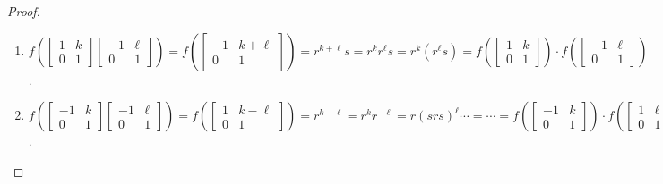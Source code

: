 \documentclass{article}
\theoremstyle{definition}
\begin{document}
\begin{proof}
\begin{enumerate}
			\item $f\left( \left[ \begin{smallmatrix} 1 & k \\ 0 & 1 \end{smallmatrix}  \right] \left[ \begin{smallmatrix} -1 & \ell \\ 0 & 1 \end{smallmatrix}  \right] \right) = f\left(\left[ \begin{smallmatrix} -1 & k+\ell \\ 0 & 1 \end{smallmatrix}  \right]\right) = r^{k+\ell}s = r^k r^{\ell}s = r^k\left(r^{\ell} s \right) = f\left( \left[ \begin{smallmatrix} 1 & k \\ 0 & 1 \end{smallmatrix}  \right]\right) \cdot f\left( \left[ \begin{smallmatrix} -1 & \ell \\ 0 & 1 \end{smallmatrix}  \right]\right)$. \checkmark
			
			\item $f\left( \left[ \begin{smallmatrix} -1 & k \\ 0 & 1 \end{smallmatrix}  \right] \left[ \begin{smallmatrix} -1 & \ell \\ 0 & 1 \end{smallmatrix}  \right] \right) = f\left(\left[ \begin{smallmatrix} 1 & k-\ell \\ 0 & 1 \end{smallmatrix}  \right]\right) = r^{k-\ell} = r^k r^{-\ell} = r \left(srs\right)^{\ell} \cdots = \cdots = f\left( \left[ \begin{smallmatrix} -1 & k \\ 0 & 1 \end{smallmatrix}  \right]\right) \cdot f\left( \left[ \begin{smallmatrix} 1 & \ell \\ 0 & 1 \end{smallmatrix}  \right]\right)$. \checkmark
		\end{enumerate}
	\end{proof}
\end{document}
